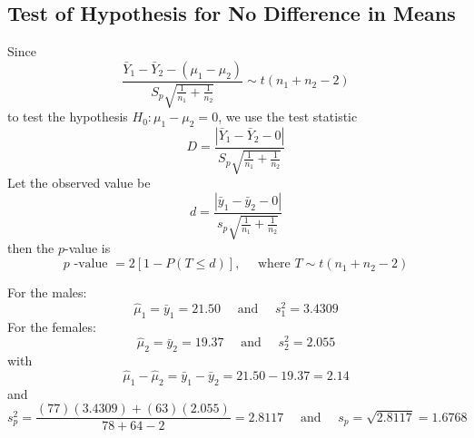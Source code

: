 \subsection{Test of Hypothesis for No Difference in Means}
Since
\[\frac{\bar{Y}_{1}-\bar{Y}_{2}-\left(\mu_{1}-\mu_{2}\right)}{S_{p} \sqrt{\frac{1}{n_{1}}+\frac{1}{n_{2}}}} \sim t\left(n_{1}+n_{2}-2\right)\]
to test the hypothesis $ H_0:\mu_1-\mu_2=0 $,
we use the test statistic
\[D=\frac{\left|\bar{Y}_{1}-\bar{Y}_{2}-0\right|}{S_{p} \sqrt{\frac{1}{n_{1}}+\frac{1}{n_{2}}}}\]
Let the observed value be
\[d=\frac{\left|\bar{y}_{1}-\bar{y}_{2}-0\right|}{s_{p} \sqrt{\frac{1}{n_{1}}+\frac{1}{n_{2}}}}\]
then the $ p $-value is
\[p \text { -value }=2[1-P(T \leq d)], \quad \text { where } T \sim t\left(n_{1}+n_{2}-2\right)\]
\begin{exbox}
    \begin{example}
        For the males:
        \[\hat{\mu}_{1}=\bar{y}_{1}=21.50 \quad \text { and } \quad s_{1}^{2}=3.4309\]
        For the females:
        \[\hat{\mu}_{2}=\bar{y}_{2}=19.37 \quad \text { and } \quad s_{2}^{2}=2.055\]
        with
        \[\hat{\mu}_{1}-\hat{\mu}_{2}=\bar{y}_{1}-\bar{y}_{2}=21.50-19.37=2.14\]
        and
        \[s_{p}^{2}=\frac{(77)(3.4309)+(63)(2.055)}{78+64-2}=2.8117 \quad \text { and } \quad s_{p}=\sqrt{2.8117}=1.6768\]

    \end{example}
\end{exbox}
